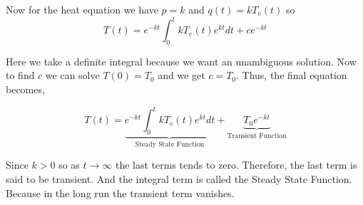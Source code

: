 Now for the heat equation we have $p = k$ and  $q(t) = kT_e(t)$ so 
$$
T(t) = e^{-kt} \int_0^t k T_e(t) e^{kt} dt + c e^{-kt} 
$$

Here we take a definite integral because we want an unambiguous solution.
Now to find $c$ we can solve $T(0) = T_0$ and we get $c = T_0$.
Thus, the final equation becomes,

$$
T(t) = \underbrace{ e^{-kt} \int_0^t k T_e(t) e^{kt} dt }_{\text{Steady State Function}} + \underbrace{T_0 e^{-kt}}_{\text{Transient Function}}
$$

Since $k > 0$ so as $t \to \infty$ the last terms tends to zero.
Therefore, the last term is said to be transient. And the integral term is called the Steady State Function.
Because in the long run the transient term vanishes.

